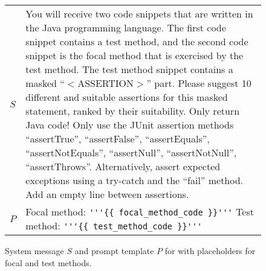 
\begin{figure*}[t]
  \scriptsize
  \setlength{\tabcolsep}{3pt}

  \begin{tabular}{lp{17.3cm}}
    \(S\)
    & 
    You will receive two code snippets that are written in the Java programming language.
    The first code snippet contains a test method, and the second code snippet is the focal method that is exercised by the test method.
    The test method snippet contains a masked \enquote{\(<\)ASSERTION\(>\)} part.
    Please suggest 10 different and suitable assertions for this masked statement, ranked by their suitability.
    Only return Java code!
    Only use the JUnit assertion methods \enquote{assertTrue}, \enquote{assertFalse}, \enquote{assertEquals}, \enquote{assertNotEquals}, \enquote{assertNull}, \enquote{assertNotNull}, \enquote{assertThrows}.
    Alternatively, assert expected exceptions using a try-catch and the \enquote{fail} method.
    Add an empty line between assertions.\\

    \(P\)
    &
    Focal method: \verb|'''{{ focal_method_code }}'''| Test method: \verb|'''{{ test_method_code }}'''|\\
  \end{tabular}
  \caption{System message \(S\) and prompt template \(P\) for \chatgpt with placeholders for focal and test methods.}\label{fig:gpt-prompt}
\end{figure*}

